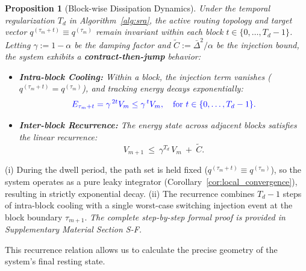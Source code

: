\documentclass[journal]{IEEEtran}
\theoremstyle{plain}
\newtheorem{proposition}{Proposition}
\theoremstyle{definition}
\newcommand{\rev}[1]{{\color{blue}#1}}
\begin{document}
\begin{proposition}[Block-wise Dissipation Dynamics]
\label{prop:block_dynamics}
Under the temporal regularization $T_d$ in Algorithm~\ref{alg:sra}, the active routing topology and target vector $q^{(\tau_m+t)} \equiv q^{(\tau_m)}$ remain invariant within each block $t \in \{0, \dots, T_d-1\}$. 
Letting $\gamma:=1-\alpha$ be the damping factor and $\tilde C:=\bar\Delta^2/\alpha$ be the injection bound, the system exhibits a \textbf{contract-then-jump} behavior:
\begin{itemize}
    \item[\textit{(i)}] \textbf{Intra-block Cooling:} Within a block, the injection term vanishes ($q^{(\tau_m+t)} = q^{(\tau_m)}$), and tracking energy decays exponentially:
    \begin{equation}\label{eq:intra_block}
    \rev{E_{\tau_m+t} = \gamma^{\,2t}V_m \le \gamma^{\,t}V_m, \quad \text{for } t \in \{0, \dots, T_d-1\}.}
    \end{equation}
    \item[\textit{(ii)}] \textbf{Inter-block Recurrence:} The energy state across adjacent blocks satisfies the linear recurrence:
    \begin{equation}\label{eq:inter_block}
    V_{m+1}\ \le\ \gamma^{T_d}\,V_m\ +\ \tilde C.
    \end{equation}
\end{itemize}
\end{proposition}
\begin{IEEEproof}
(i) During the dwell period, the path set is held fixed ($q^{(\tau_m+t)} \equiv q^{(\tau_m)}$), so the system operates as a pure leaky integrator (Corollary~\ref{cor:local_convergence}), resulting in strictly exponential decay. (ii) The recurrence combines $T_d-1$ steps of intra-block cooling with a single worst-case switching injection event at the block boundary $\tau_{m+1}$. \textit{The complete step-by-step formal proof is provided in Supplementary Material Section S-F.}
\end{IEEEproof}

This recurrence relation allows us to calculate the precise geometry of the system's final resting state.
\end{document}
